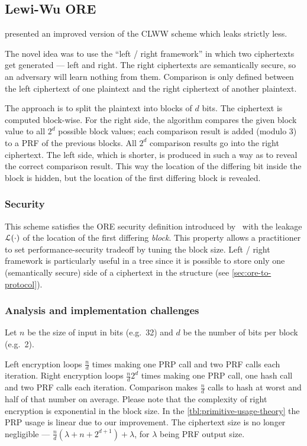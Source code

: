\subsection{Lewi-Wu ORE}

	\textcite{lewi-wu-ore} presented an improved version of the CLWW scheme \cite{clww-ore} which leaks strictly less.

	The novel idea was to use the ``left / right framework'' in which two ciphertexts get generated --- left and right.
	The right ciphertexts are semantically secure, so an adversary will learn nothing from them.
	Comparison is only defined between the left ciphertext of one plaintext and the right ciphertext of another plaintext.

	The approach is to split the plaintext into blocks of $d$ bits.
	The ciphertext is computed block-wise.
	For the right side, the algorithm compares the given block value to all $2^d$ possible block values; each comparison result is added (modulo 3) to a PRF of the previous blocks.
	All $2^d$ comparison results go into the right ciphertext.
	The left side, which is shorter, is produced in such a way as to reveal the correct comparison result.
	This way the location of the differing bit inside the block is hidden, but the location of the first differing block is revealed.

	\subsubsection{Security}
		This scheme satisfies the ORE security definition introduced by~\textcite{clww-ore} with the leakage $\mathcal{L}(\cdot)$ of the location of the first differing \emph{block}.
		This property allows a practitioner to set performance-security tradeoff by tuning the block size.
		Left / right framework is particularly useful in a {\BPlus} tree since it is possible to store only one (semantically secure) side of a ciphertext in the structure (see \cref{sec:ore-to-protocol}).

	\subsubsection{Analysis and implementation challenges}

		Let $n$ be the size of input in bits (e.g.\ 32) and $d$ be the number of bits per block (e.g.\ 2).

		Left encryption loops $\frac{n}{d}$ times making one PRP call and two PRF calls each iteration.
		Right encryption loops $\frac{n}{d} 2^d$ times making one PRP call, one hash call and two PRF calls each iteration.
		Comparison makes $\frac{n}{d}$ calls to hash at worst and half of that number on average.
		Please note that the complexity of right encryption is exponential in the block size.
		In the \cref{tbl:primitive-usage-theory} the PRP usage is linear due to our improvement.
		The ciphertext size is no longer negligible --- $\frac{n}{d} \left(\lambda + n + 2^{d + 1} \right) + \lambda$, for $\lambda$ being PRF output size.

